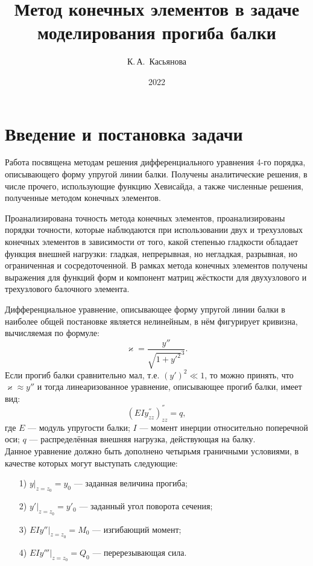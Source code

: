 \documentclass[12pt,a4paper]{article}
\title{Метод конечных элементов в задаче моделирования прогиба балки}
\author{К.\,А.~Касьянова}
\date{2022}
\begin{document}
    \maketitle
	\tableofcontents
	\pagebreak

	\section{Введение и постановка задачи}
	Работа посвящена методам решения дифференциального уравнения 4-го порядка, описывающего форму упругой линии балки. Получены аналитические решения, в числе прочего, использующие функцию Хевисайда, а также численные решения, полученные методом конечных элементов.

	Проанализирована точность метода конечных элементов, проанализированы порядки точности, которые наблюдаются при использовании двух и трехузловых конечных элементов в зависимости от того, какой степенью гладкости обладает функция внешней нагрузки: гладкая, непрерывная, но негладкая, разрывная, но ограниченная и  сосредоточенной.  В рамках метода конечных элементов получены выражения для функций форм и компонент матриц жёсткости для двухузлового и трехузлового балочного элемента.

	Дифференциальное уравнение, описывающее форму упругой линии балки в наиболее общей постановке является нелинейным, в нём фигурирует кривизна, вычисляемая по формуле: 
	$$ \varkappa = \frac{y''}{\sqrt{1+y'^{2}}^{3}}.$$
	Если прогиб балки сравнительно мал, т.е. $(y')^{2} \ll 1$, то можно принять, что $\varkappa \approx y''$ и тогда линеаризованное уравнение, описывающее прогиб балки, имеет вид:
	\begin{equation}
	(EIy^{''}_{zz})^{''}_{zz}=q,
	\label{v1}
	\end{equation}
	где $E$ --- модуль упругости балки; $I$ --- момент инерции относительно поперечной оси; $q$ --- распределённая внешняя нагрузка, действующая на балку. \\
 
Данное уравнение должно быть дополнено четырьмя граничными условиями, в качестве которых могут выступать следующие: 
\begin{enumerate}
\item[1)] $y|_{z=z_{0}}=y_{0}$ --- заданная величина прогиба;
\item[2)] $y'|_{z=z_{0}}=y'_{0}$ --- заданный угол поворота сечения;
\item[3)] $EIy''|_{z=z_{0}}=M_{0}$ --- изгибающий момент;
\item[4)] $EIy'''|_{z=z_{0}}= Q_{0}$ --- перерезывающая сила.
\end{enumerate}
\end{document}

